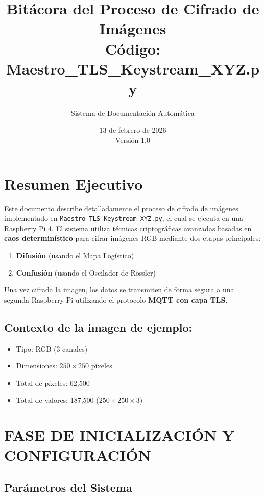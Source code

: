 \documentclass[12pt,a4paper]{article}
\title{\textbf{Bitácora del Proceso de Cifrado de Imágenes}\\
\large{Código: Maestro\_TLS\_Keystream\_XYZ.py}}
\author{Sistema de Documentación Automática}
\date{13 de febrero de 2026 \\ Versión 1.0}
\begin{document}
\maketitle
\thispagestyle{empty}

\newpage
\tableofcontents
\newpage

\section{Resumen Ejecutivo}

Este documento describe detalladamente el proceso de cifrado de imágenes implementado en \texttt{Maestro\_TLS\_Keystream\_XYZ.py}, el cual se ejecuta en una Raspberry Pi 4. El sistema utiliza técnicas criptográficas avanzadas basadas en \textbf{caos determinístico} para cifrar imágenes RGB mediante dos etapas principales:

\begin{enumerate}
    \item \textbf{Difusión} (usando el Mapa Logístico)
    \item \textbf{Confusión} (usando el Oscilador de Rössler)
\end{enumerate}

Una vez cifrada la imagen, los datos se transmiten de forma segura a una segunda Raspberry Pi utilizando el protocolo \textbf{MQTT con capa TLS}.

\subsection*{Contexto de la imagen de ejemplo:}
\begin{itemize}
    \item Tipo: RGB (3 canales)
    \item Dimensiones: $250 \times 250$ píxeles
    \item Total de píxeles: 62,500
    \item Total de valores: 187,500 ($250 \times 250 \times 3$)
\end{itemize}

\section{FASE DE INICIALIZACIÓN Y CONFIGURACIÓN}

\subsection{Parámetros del Sistema}
\end{document}
